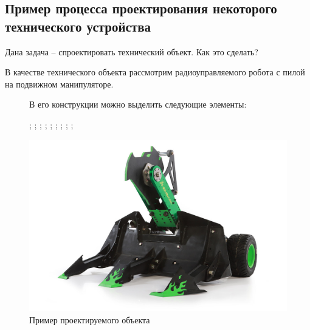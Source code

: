 ﻿%
\subsection{Пример процесса проектирования некоторого технического устройства}
\begin{frame}%
Дана задача -- спроектировать технический объект. Как это сделать?

В качестве технического объекта рассмотрим радиоуправляемого робота с пилой на подвижном манипуляторе.
\begin{figure}[!ht]
  \begin{minipage}{0.455\linewidth}
    В его конструкции можно выделить следующие элементы:
    \begin{itemize}
      \smaller[1]
      ;
      ;
      ;
      ;
      ;
      ;
      ;
      ;
      ;
      \arrowitem{\ldots}
    \end{itemize}
  \end{minipage}%
  \begin{minipage}{0.455\linewidth}
    \centering
    \includegraphics[width=\textwidth]{images/robot.jpg}
    \caption{Пример проектируемого объекта}
    \label{fig:technicalObjectExample}
  \end{minipage}
\end{figure}


\end{frame}
